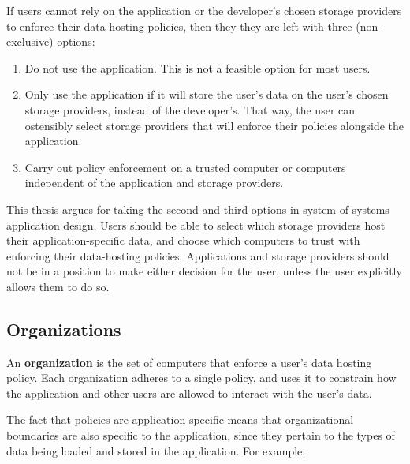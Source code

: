 If users cannot rely on the application or the developer's chosen storage providers
to enforce their data-hosting policies, then they they are left with three
(non-exclusive) options:

\begin{enumerate}
   \item Do not use the application.  This is not a feasible option for
      most users.
   \item Only use the application if it will store the user's data on the user's
      chosen storage providers, instead of the developer's.  That
      way, the user can ostensibly select storage providers that will enforce 
      their policies alongside the application.
   \item Carry out policy enforcement on a trusted computer or computers
      independent of the application and storage providers.
\end{enumerate}

This thesis argues for taking the second and third options in system-of-systems
application design.  Users should be able to select which storage providers
host their application-specific data, and choose which computers to trust
with enforcing their data-hosting policies.
Applications and storage providers should not be in a position to make either
decision for the user, unless the user explicitly allows them to do so.

\subsection{Organizations}

An \textbf{organization} is the set of computers that enforce a user's
data hosting policy.  Each organization adheres to a single
policy, and uses it to constrain how the application and other users are allowed to
interact with the user's data.

The fact that policies are application-specific means that organizational boundaries
are also specific to the application, since they pertain to the types of data being loaded
and stored in the application.  For example:

